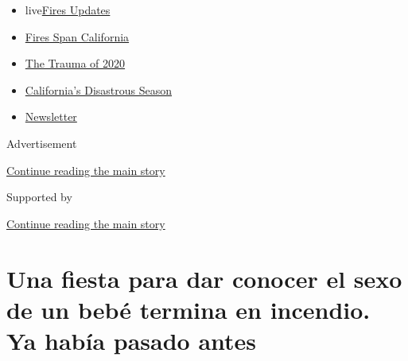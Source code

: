 \begin{itemize}
\tightlist
\item
  live\href{https://www.nytimes3xbfgragh.onion/2020/09/08/us/wildfires-live-updates.html?name=styln-california-wildfires\&region=TOP_BANNER\&block=storyline_menu_recirc\&action=click\&pgtype=Article\&impression_id=fae56381-f289-11ea-a60b-a756defe8488\&variant=undefined}{Fires
  Updates}
\item
  \href{https://www.nytimes3xbfgragh.onion/2020/09/07/us/ca-wildfires-heatwave.html?name=styln-california-wildfires\&region=TOP_BANNER\&block=storyline_menu_recirc\&action=click\&pgtype=Article\&impression_id=fae58a90-f289-11ea-a60b-a756defe8488\&variant=undefined}{Fires
  Span California}
\item
  \href{https://www.nytimes3xbfgragh.onion/2020/08/26/us/california-wildfires-lake-berryessa.html?name=styln-california-wildfires\&region=TOP_BANNER\&block=storyline_menu_recirc\&action=click\&pgtype=Article\&impression_id=fae58a91-f289-11ea-a60b-a756defe8488\&variant=undefined}{The
  Trauma of 2020}
\item
  \href{https://www.nytimes3xbfgragh.onion/article/why-does-california-have-wildfires.html?name=styln-california-wildfires\&region=TOP_BANNER\&block=storyline_menu_recirc\&action=click\&pgtype=Article\&impression_id=fae58a92-f289-11ea-a60b-a756defe8488\&variant=undefined}{California's
  Disastrous Season}
\item
  \href{https://www.nytimes3xbfgragh.onion/2020/09/08/us/california-wildfire-heat-wave.html?name=styln-california-wildfires\&region=TOP_BANNER\&block=storyline_menu_recirc\&action=click\&pgtype=Article\&impression_id=fae58a93-f289-11ea-a60b-a756defe8488\&variant=undefined}{Newsletter}
\end{itemize}

Advertisement

\protect\hyperlink{after-top}{Continue reading the main story}

Supported by

\protect\hyperlink{after-sponsor}{Continue reading the main story}

\hypertarget{una-fiesta-para-dar-conocer-el-sexo-de-un-bebuxe9-termina-en-incendio-ya-habuxeda-pasado-antes}{%
\section{Una fiesta para dar conocer el sexo de un bebé termina en
incendio. Ya había pasado
antes}\label{una-fiesta-para-dar-conocer-el-sexo-de-un-bebuxe9-termina-en-incendio-ya-habuxeda-pasado-antes}}

